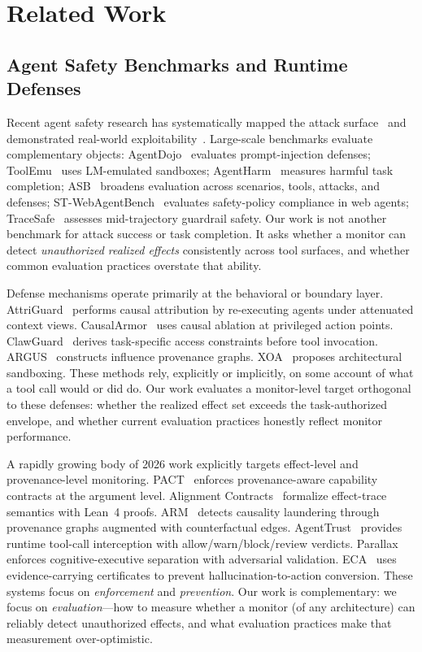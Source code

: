 \documentclass{article}
\begin{document}
\section{Related Work}

\subsection{Agent Safety Benchmarks and Runtime Defenses}

Recent agent safety research has systematically mapped the attack surface~\cite{lasm2026,sok2026} and demonstrated real-world exploitability~\cite{jaw2026,litmus2026,queryipi2026}. Large-scale benchmarks evaluate complementary objects: AgentDojo~\cite{agentdojo2024} evaluates prompt-injection defenses; ToolEmu~\cite{toolemu2024} uses LM-emulated sandboxes; AgentHarm~\cite{agentharm2025} measures harmful task completion; ASB~\cite{asb2025} broadens evaluation across scenarios, tools, attacks, and defenses; ST-WebAgentBench~\cite{stwebagentbench2026} evaluates safety-policy compliance in web agents; TraceSafe~\cite{tracesafe2026} assesses mid-trajectory guardrail safety. Our work is not another benchmark for attack success or task completion. It asks whether a monitor can detect \emph{unauthorized realized effects} consistently across tool surfaces, and whether common evaluation practices overstate that ability.

Defense mechanisms operate primarily at the behavioral or boundary layer. AttriGuard~\cite{attrguard2026} performs causal attribution by re-executing agents under attenuated context views. CausalArmor~\cite{causalarmor2026} uses causal ablation at privileged action points. ClawGuard~\cite{clawguard2026} derives task-specific access constraints before tool invocation. ARGUS~\cite{argus2026} constructs influence provenance graphs. XOA~\cite{xoa2026} proposes architectural sandboxing. These methods rely, explicitly or implicitly, on some account of what a tool call would or did do. Our work evaluates a monitor-level target orthogonal to these defenses: whether the realized effect set exceeds the task-authorized envelope, and whether current evaluation practices honestly reflect monitor performance.

A rapidly growing body of 2026 work explicitly targets effect-level and provenance-level monitoring. PACT~\cite{pact2026} enforces provenance-aware capability contracts at the argument level. Alignment Contracts~\cite{alignmentcontracts2026} formalize effect-trace semantics with Lean~4 proofs. ARM~\cite{arm2026} detects causality laundering through provenance graphs augmented with counterfactual edges. AgentTrust~\cite{agenttrust2026} provides runtime tool-call interception with allow/warn/block/review verdicts. Parallax~\cite{parallax2026} enforces cognitive-executive separation with adversarial validation. ECA~\cite{eca2026} uses evidence-carrying certificates to prevent hallucination-to-action conversion. These systems focus on \emph{enforcement} and \emph{prevention}. Our work is complementary: we focus on \emph{evaluation}---how to measure whether a monitor (of any architecture) can reliably detect unauthorized effects, and what evaluation practices make that measurement over-optimistic.
\end{document}
